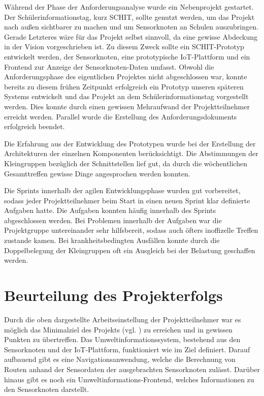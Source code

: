 Während der Phase der Anforderungsanalyse wurde ein Nebenprojekt gestartet. Der Schülerinformationstag, kurz SCHIT, sollte genutzt werden, um das Projekt nach außen sichtbarer zu machen und um Sensorknoten an Schulen auszubringen. Gerade Letzteres wäre für das Projekt selbst sinnvoll, da eine gewisse Abdeckung in der Vision vorgeschrieben ist. 
Zu diesem Zweck sollte ein SCHIT-Prototyp entwickelt werden, der Sensorknoten, eine prototypische IoT-Plattform und ein Frontend zur Anzeige der Sensorknoten-Daten umfasst. 
Obwohl die Anforderungsphase des eigentlichen Projektes nicht abgeschlossen war, konnte bereits zu diesem frühen Zeitpunkt erfolgreich ein Prototyp unseren späteren Systems entwickelt und das Projekt an dem Schülerinformationstag vorgestellt werden. 
Dies konnte durch einen gewissen Mehraufwand der Projektteilnehmer erreicht werden. 
Parallel wurde die Erstellung des Anforderungsdokuments erfolgreich beendet.

Die Erfahrung aus der Entwicklung des Prototypen wurde bei der Erstellung der Architekturen der einzelnen Komponenten berücksichtigt. 
Die Abstimmungen der Kleingruppen bezüglich der Schnittstellen lief gut, da durch die wöchentlichen Gesamttreffen gewisse Dinge angesprochen werden konnten. 

Die Sprints innerhalb der agilen Entwicklungsphase wurden gut vorbereitet, sodass jeder Projektteilnehmer beim Start in einen neuen Sprint klar definierte Aufgaben hatte. 
Die Aufgaben konnten häufig innerhalb des Sprints abgeschlossen werden. 
Bei Problemen innerhalb der Aufgaben war die Projektgruppe untereinander sehr hilfsbereit, sodass auch öfters inoffizelle Treffen zustande kamen.
Bei krankheitsbedingten Ausfällen konnte durch die Doppelbelegung der Kleingruppen oft ein Ausgleich bei der Belastung geschaffen werden.

\section{Beurteilung des Projekterfolgs}
Durch die oben dargestellte Arbeitseinstellung der Projektteilnehmer war es möglich das Minimalziel des Projekts (vgl. ) zu erreichen und in gewissen Punkten zu übertreffen. 
Das Umweltinformationssystem, bestehend aus den Sensorknoten und der IoT-Plattform, funktioniert wie im Ziel definiert. 
Darauf aufbauend gibt es eine Navigationsanwendung, welche die Berechnung von Routen anhand der Sensordaten der ausgebrachten Sensorknoten zulässt.
Darüber hinaus gibt es noch ein Umweltinformations-Frontend, welches Informationen zu den Sensorknoten darstellt.

